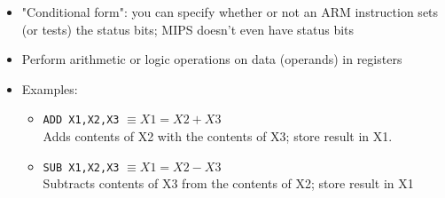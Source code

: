 \begin{frame}[fragile]
\begin{itemize}

 \item "Conditional form": you can specify whether or not an ARM
	instruction sets (or tests) the status bits; MIPS doesn't
	even have status bits
\end{itemize}
\fi\ENotes
\end{frame}

\begin{frame}[fragile]
 \begin{itemize}
 \item  Perform arithmetic or logic operations on data (operands) in registers
     \item Examples:
     \begin{itemize}
         \item \texttt{ADD X1,X2,X3} $ \equiv X1 = X2 + X3$ \\
   Adds contents of X2 with the contents of X3; store result in X1. 
\item \texttt{SUB X1,X2,X3} $\equiv X1 = X2 - X3$\\
   Subtracts contents of X3 from the contents of X2; store result in X1
     \end{itemize}
 \end{itemize}



\end{frame}
